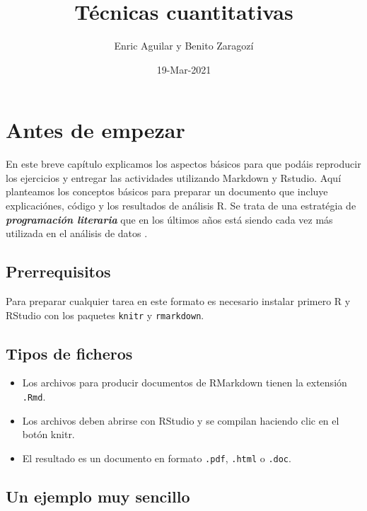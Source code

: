 \documentclass[
]{book}
\title{Técnicas cuantitativas}
\author{Enric Aguilar y Benito Zaragozí}
\date{19-Mar-2021}
\providecommand{\tightlist}{%
  \setlength{\itemsep}{0pt}\setlength{\parskip}{0pt}}
\begin{document}
\maketitle

{
\setcounter{tocdepth}{1}
\tableofcontents
}
\hypertarget{antes-de-empezar}{%
\chapter{Antes de empezar}\label{antes-de-empezar}}

En este breve capítulo explicamos los aspectos básicos para que podáis reproducir los ejercicios y entregar las actividades utilizando Markdown y Rstudio. Aquí planteamos los conceptos básicos para preparar un documento que incluye explicaciónes, código y los resultados de análisis R. Se trata de una estratégia de \textbf{\emph{programación literaria}} que en los últimos años está siendo cada vez más utilizada en el análisis de datos \citep{knuth1984literate, xie2015knitr}.

\hypertarget{prerrequisitos}{%
\section{Prerrequisitos}\label{prerrequisitos}}

Para preparar cualquier tarea en este formato es necesario instalar primero R y RStudio con los paquetes \texttt{knitr} y \texttt{rmarkdown}.

\hypertarget{tipos-de-ficheros}{%
\section{Tipos de ficheros}\label{tipos-de-ficheros}}

\begin{itemize}
\tightlist
\item
  Los archivos para producir documentos de RMarkdown tienen la extensión \texttt{.Rmd}.
\item
  Los archivos deben abrirse con RStudio y se compilan haciendo clic en el botón knitr.
\item
  El resultado es un documento en formato \texttt{.pdf}, \texttt{.html} o \texttt{.doc}.
\end{itemize}

\hypertarget{un-ejemplo-muy-sencillo}{%
\section{Un ejemplo muy sencillo}\label{un-ejemplo-muy-sencillo}}
\end{document}
